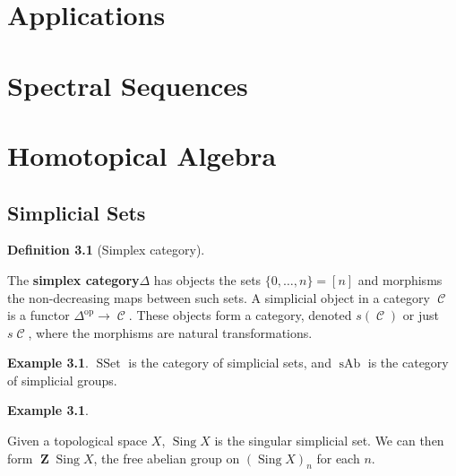\documentclass[10pt,]{book}
\newcommand{\terminology}[1]{\textbf{#1}}
\theoremstyle{plain}
\theoremstyle{definition}
\newtheorem{definition}[theorem]{Definition}
\newtheorem{example}[theorem]{Example}
\numberwithin{equation}{section}
\DeclareMathOperator{\op}{op}
\DeclareMathOperator{\Sing}{Sing}
\DeclareMathOperator{\SSet}{\text{SSet}}
\DeclareMathOperator{\sAb}{\text{sAb}}
\DeclareMathOperator{\cC}{\mathcal{C}}
\DeclareMathOperator{\ZZ}{\mathbf{Z}}
\begin{document}
\chapter[Applications]{Applications}\label{chap-apps}
\typeout{************************************************}
\typeout{************************************************}
\chapter[Spectral Sequences]{Spectral Sequences}\label{chap-spec-seq}
\typeout{************************************************}
\typeout{************************************************}
\chapter[Homotopical Algebra]{Homotopical Algebra}\label{chap-homotopical}
\typeout{************************************************}
\typeout{************************************************}
\section[Simplicial Sets]{Simplicial Sets}\label{sec-simplicial-sets}
\begin{definition}[Simplex category]\label{definition-25}

            The \terminology{simplex category}\(\Delta\) has objects the sets \(\{0,\ldots,n\} = [n]\) and morphisms the non-decreasing maps between such sets.
            A simplicial object in a category \(\cC\) is a functor \(\Delta^{\op} \to \cC\).
            These objects form a category, denoted \(s(\cC)\) or just \(s\cC\), where the morphisms are natural transformations.
          \end{definition}
\begin{example}\label{example-14}
\(\SSet\) is the category of simplicial sets, and \(\sAb\) is the category of simplicial groups.
          \end{example}
\begin{example}\label{example-15}

            Given a topological space \(X\), \(\Sing X\) is the singular simplicial set.
            We can then form \(\ZZ\Sing X\), the free abelian group on \((\Sing X)_n\) for each \(n\).
          \end{example}
\end{document}
